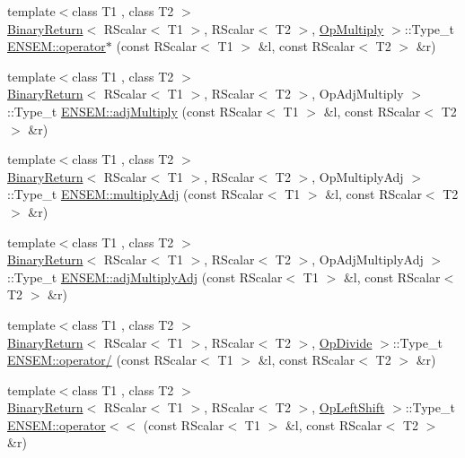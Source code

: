 \begin{DoxyCompactItemize}
\item 
{\footnotesize template$<$class T1 , class T2 $>$ }\\\mbox{\hyperlink{structBinaryReturn}{Binary\+Return}}$<$ R\+Scalar$<$ T1 $>$, R\+Scalar$<$ T2 $>$, \mbox{\hyperlink{structOpMultiply}{Op\+Multiply}} $>$\+::Type\+\_\+t \mbox{\hyperlink{group__rscalar_gadab7ad151ff9bea909186af226815d96}{E\+N\+S\+E\+M\+::operator$\ast$}} (const R\+Scalar$<$ T1 $>$ \&l, const R\+Scalar$<$ T2 $>$ \&r)
\item 
{\footnotesize template$<$class T1 , class T2 $>$ }\\\mbox{\hyperlink{structBinaryReturn}{Binary\+Return}}$<$ R\+Scalar$<$ T1 $>$, R\+Scalar$<$ T2 $>$, Op\+Adj\+Multiply $>$\+::Type\+\_\+t \mbox{\hyperlink{group__rscalar_gaed3e42d4304edfd5a3838b8b1b559e37}{E\+N\+S\+E\+M\+::adj\+Multiply}} (const R\+Scalar$<$ T1 $>$ \&l, const R\+Scalar$<$ T2 $>$ \&r)
\item 
{\footnotesize template$<$class T1 , class T2 $>$ }\\\mbox{\hyperlink{structBinaryReturn}{Binary\+Return}}$<$ R\+Scalar$<$ T1 $>$, R\+Scalar$<$ T2 $>$, Op\+Multiply\+Adj $>$\+::Type\+\_\+t \mbox{\hyperlink{group__rscalar_ga5b26c70325ac5d320cfd53d629b3d0c4}{E\+N\+S\+E\+M\+::multiply\+Adj}} (const R\+Scalar$<$ T1 $>$ \&l, const R\+Scalar$<$ T2 $>$ \&r)
\item 
{\footnotesize template$<$class T1 , class T2 $>$ }\\\mbox{\hyperlink{structBinaryReturn}{Binary\+Return}}$<$ R\+Scalar$<$ T1 $>$, R\+Scalar$<$ T2 $>$, Op\+Adj\+Multiply\+Adj $>$\+::Type\+\_\+t \mbox{\hyperlink{group__rscalar_ga98ba0296fc190036d2587357efbd8ca2}{E\+N\+S\+E\+M\+::adj\+Multiply\+Adj}} (const R\+Scalar$<$ T1 $>$ \&l, const R\+Scalar$<$ T2 $>$ \&r)
\item 
{\footnotesize template$<$class T1 , class T2 $>$ }\\\mbox{\hyperlink{structBinaryReturn}{Binary\+Return}}$<$ R\+Scalar$<$ T1 $>$, R\+Scalar$<$ T2 $>$, \mbox{\hyperlink{structOpDivide}{Op\+Divide}} $>$\+::Type\+\_\+t \mbox{\hyperlink{group__rscalar_ga152c5f3a8197a5f6804ad19fc8987ed2}{E\+N\+S\+E\+M\+::operator/}} (const R\+Scalar$<$ T1 $>$ \&l, const R\+Scalar$<$ T2 $>$ \&r)
\item 
{\footnotesize template$<$class T1 , class T2 $>$ }\\\mbox{\hyperlink{structBinaryReturn}{Binary\+Return}}$<$ R\+Scalar$<$ T1 $>$, R\+Scalar$<$ T2 $>$, \mbox{\hyperlink{structOpLeftShift}{Op\+Left\+Shift}} $>$\+::Type\+\_\+t \mbox{\hyperlink{group__rscalar_ga6cce85d32b25e3574980320d6e6bd811}{E\+N\+S\+E\+M\+::operator$<$$<$}} (const R\+Scalar$<$ T1 $>$ \&l, const R\+Scalar$<$ T2 $>$ \&r)

\end{DoxyCompactItemize}
